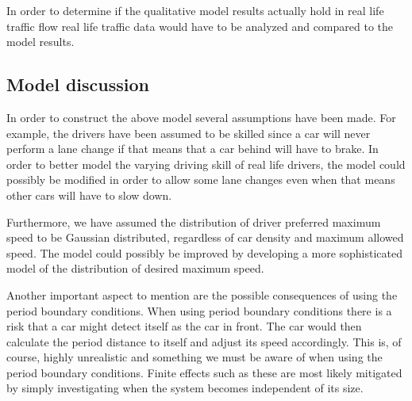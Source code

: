 \documentclass[a4paper,12pt]{article}
\begin{document}
In order to determine if the qualitative model results actually hold in real life traffic flow real life traffic data would have to be analyzed and compared to the model results.

\subsection*{Model discussion}
In order to construct the above model several assumptions have been made. For example, the drivers have been assumed to be skilled
since a car will never perform a lane change if that means that a car behind will have to brake. In order to better model the varying
driving skill of real life drivers, the model could possibly be modified in order to allow some lane changes even when that means other 
cars will have to slow down.

Furthermore, we have assumed the distribution of driver preferred maximum speed to be Gaussian distributed, regardless of car density and maximum allowed speed.
The model could possibly be improved by developing a more sophisticated model of the distribution of desired maximum speed.

Another important aspect to mention are the possible consequences of using the period boundary conditions. When using period boundary conditions there is a risk
that a car might detect itself as the car in front. The car would then calculate the period distance to itself and adjust its speed accordingly. 
This is, of course, highly unrealistic and something we must be aware of when using the period boundary conditions. Finite effects such as these are most likely mitigated
by simply investigating when the system becomes independent of its size.
\end{document}
